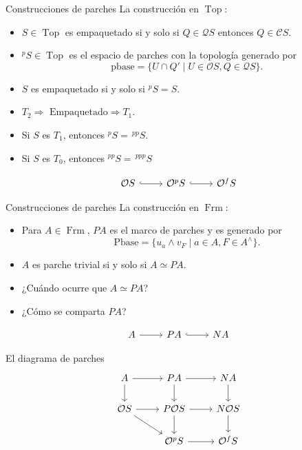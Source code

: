 \documentclass[compress,12pt]{beamer}
\DeclareMathOperator{\Frm}{Frm}
\DeclareMathOperator{\Top}{Top}
\begin{document}
\begin{frame}[fragile]{Construcciones de parches}
	La construcción en $\Top$:
	\begin{itemize}
		\item $S\in \Top$ es empaquetado si y solo si $Q\in \mathcal{Q}S$ entonces $Q\in \mathcal{C}S$. 
		\item $^pS\in \Top$ es el espacio de parches con la topología generado por 
		\[
		\mbox{pbase}=\{U\cap Q'\mid U\in \mathcal{O}S, Q\in \mathcal{Q}S\}.
		\]
		\item $S$ es empaquetado si y solo si $^pS=S$.
		\item $T_2\Rightarrow \mbox{ Empaquetado}\Rightarrow T_1$.
		\item Si $S$ es $T_1$, entonces $^pS=\,^{pp}S$.
		\item Si $S$ es $T_0$, entonces $^{pp}S=\,^{ppp}S$
	\end{itemize}
	\[\begin{tikzcd}
	{\mathcal{O}S} & {\mathcal{O}^pS} & {\mathcal{O}^fS}
	\arrow[hook, from=1-1, to=1-2]
	\arrow[hook, from=1-2, to=1-3]
\end{tikzcd}\]
\end{frame}

\begin{frame}[fragile]{Construcciones de parches}
	La construcción en $\Frm$:
	\begin{itemize}
		\item Para $A\in \Frm$, $PA$ es el marco de parches y es generado por 
		\[
		\mbox{Pbase}=\{u_a\wedge v_F\mid a\in A, F\in A^\wedge\}.
		\] 
		\item $A$ es parche trivial si y solo si $A\simeq PA$.
		\item ¿Cuándo ocurre que $A\simeq PA$?
		\item ¿Cómo se comparta $PA$?
	\end{itemize}
	\[\begin{tikzcd}
	{A} & {PA} & {NA}
	\arrow[from=1-1, to=1-2]
	\arrow[hook, from=1-2, to=1-3]
\end{tikzcd}\]
\end{frame}

\begin{frame}[fragile]{El diagrama de parches}
\begin{equation}\label{Diagrama de parches}
	\begin{tikzcd}
	A & PA & NA \\
	{\mathcal{O}S} & {P\mathcal{O}S} & {N\mathcal{O}S} \\
	& {\mathcal{O}^pS} & {\mathcal{O}^fS}
	\arrow[from=1-1, to=1-2]
	\arrow[from=1-1, to=2-1]
	\arrow[from=1-2, to=1-3]
	\arrow[from=1-2, to=2-2]
	\arrow[from=1-3, to=2-3]
	\arrow[from=2-1, to=2-2]
	\arrow[from=2-1, to=3-2]
	\arrow[from=2-2, to=2-3]
	\arrow[from=2-2, to=3-2]
	\arrow[from=2-3, to=3-3]
	\arrow[from=3-2, to=3-3]
\end{tikzcd}
\end{equation}
\end{frame}
\end{document}
